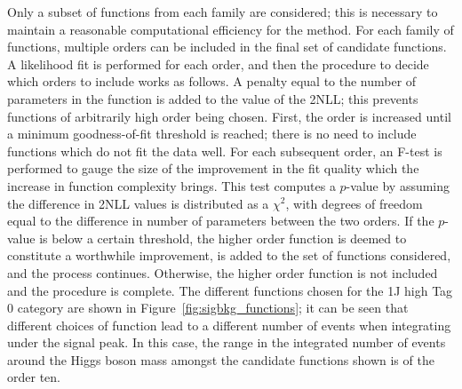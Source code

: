 Only a subset of functions from each family are considered;
this is necessary to maintain a reasonable computational efficiency for the method.
For each family of functions, multiple orders can be included in the final set of candidate functions.
A likelihood fit is performed for each order, 
and then the procedure to decide which orders to include works as follows.
A penalty equal to the number of parameters in the function is added to the value of the 2NLL;
this prevents functions of arbitrarily high order being chosen.
First, the order is increased until a minimum goodness-of-fit threshold is reached;
there is no need to include functions which do not fit the data well. %
For each subsequent order, an F-test \cite{Fisher} is performed to gauge the size of the improvement in the fit
quality which the increase in function complexity brings.
This test computes a $p$-value by assuming the difference in 2NLL values 
is distributed as a $\chi^2$, with degrees of freedom equal to 
the difference in number of parameters between the two orders.
If the $p$-value is below a certain threshold, %
the higher order function is deemed to constitute a worthwhile improvement, 
is added to the set of functions considered, and the process continues.
Otherwise, the higher order function is not included and the procedure is complete.
The different functions chosen for the 1J high Tag 0 category 
are shown in Figure~\ref{fig:sigbkg_functions};
it can be seen that different choices of function lead to a different number of events 
when integrating under the signal peak.
In this case, the range in the integrated number of events around the Higgs boson mass
amongst the candidate functions shown is of the order ten.

